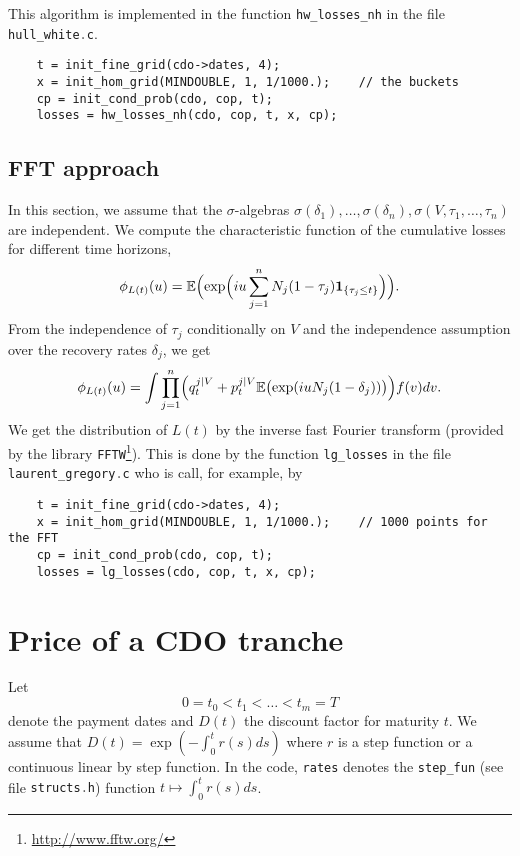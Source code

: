 \documentclass[10pt, a4paper]{article}
\newcommand{\code}[1]{{\upshape \lstinline[language=c]{#1}}}
\newcommand{\E}{\mathbb{E}}
\begin{document}
This algorithm is implemented in the function \code{hw_losses_nh} in the file \code{hull_white.c}. 
\begin{lstlisting}
    t = init_fine_grid(cdo->dates, 4);
    x = init_hom_grid(MINDOUBLE, 1, 1/1000.);    // the buckets 
    cp = init_cond_prob(cdo, cop, t);
    losses = hw_losses_nh(cdo, cop, t, x, cp);
\end{lstlisting}


\subsection{FFT approach}
In this section, we assume that the $\sigma$-algebras $\sigma(\delta_1), \dots, \sigma(\delta_n), \sigma(V, \tau_1, \dots, \tau_n)$ are independent. We compute the characteristic function of the cumulative losses for different time horizons,
\begin{equation*}
    \phi_{L(t)}(u) = \E \Bigl( \exp \Bigl(i u \sum_{j=1}^n N_j (1 - \tau_j) \mathbf{1}_{\{\tau_j \le t\}} \Bigr) \Bigr).
\end{equation*}
From the independence of $\tau_j$ conditionally on $V$ and the independence assumption over the recovery rates $\delta_j$, we get
\begin{equation*}
    \phi_{L(t)}(u) = \int \prod_{j=1}^n \Bigl( q^{j|V}_t + p^{j|V}_t \E \bigl( \exp(i u N_j (1-\delta_j))\bigr)\Bigr) f(v) d v.
\end{equation*}
We get the distribution of $L(t)$ by the inverse fast Fourier transform (provided by the library \code{FFTW}\footnote{\url{http://www.fftw.org/}}). This is done by the function \code{lg_losses} in the file \code{laurent_gregory.c} who is call, for example, by 
\begin{lstlisting}
    t = init_fine_grid(cdo->dates, 4);
    x = init_hom_grid(MINDOUBLE, 1, 1/1000.);    // 1000 points for the FFT
    cp = init_cond_prob(cdo, cop, t);
    losses = lg_losses(cdo, cop, t, x, cp);
\end{lstlisting}

\section{Price of a CDO tranche}
Let 
\begin{equation*}
    0 = t_0 < t_1 < \dots < t_m = T
\end{equation*}
denote the payment dates and $D(t)$ the discount factor for maturity $t$. We assume that $D(t) = \exp(- \int_0^t r(s) ds)$ where $r$ is a step function or a continuous linear by step function. In the code, \code{rates} denotes the \code{step_fun} (see file \code{structs.h}) function $t \mapsto \int_0^t r(s) d s$. 
\end{document}
